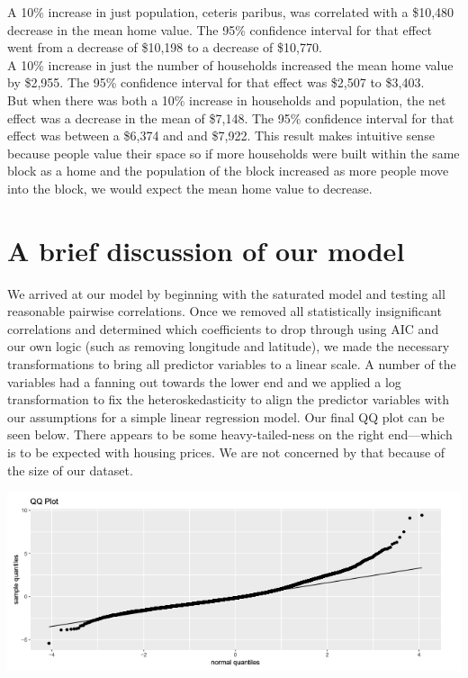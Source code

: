 \documentclass{article}
\begin{document}
A 10\% increase in just population, ceteris paribus, was correlated with a \$10,480 decrease in the mean home value. The 95\% confidence interval for that effect went from a decrease of \$10,198 to a decrease of \$10,770. \\ 

A 10\% increase in just the number of households increased the mean home value by \$2,955. The 95\% confidence interval for that effect was \$2,507 to \$3,403. \\

But when there was both a 10\% increase in households and population, the net effect was a decrease in the mean of \$7,148. The 95\% confidence interval for that effect was between a \$6,374 and and \$7,922. This result makes intuitive sense because people value their space so if more households were built within the same block as a home and the population of the block increased as more people move into the block, we would expect the mean home value to decrease. \\

\section*{A brief discussion of our model}

We arrived at our model by beginning with the saturated model and testing all reasonable pairwise correlations. Once we removed all statistically insignificant correlations and determined which coefficients to drop through using AIC and our own logic (such as removing longitude and latitude), we made the necessary transformations to bring all predictor variables to a linear scale. A number of the variables had a fanning out towards the lower end and we applied a log transformation to fix the heteroskedasticity to align the predictor variables with our assumptions for a simple linear regression model. Our final QQ plot can be seen below. There appears to be some heavy-tailed-ness on the right end—which is to be expected with housing prices. We are not concerned by that because of the size of our dataset.

\hfill

\begin{center}
\includegraphics[scale = 0.65]{QQ Plot.png}
\end{center}
\end{document}
